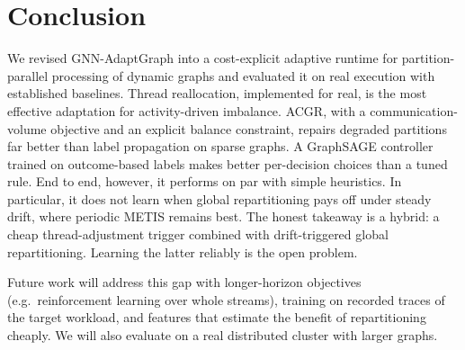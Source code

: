 \section{Conclusion}
We revised GNN-AdaptGraph into a cost-explicit adaptive runtime for partition-parallel
processing of dynamic graphs and evaluated it on real execution with established baselines.
Thread reallocation, implemented for real, is the most effective adaptation for
activity-driven imbalance. ACGR, with a communication-volume objective and an explicit balance
constraint, repairs degraded partitions far better than label propagation on sparse graphs.
A GraphSAGE controller trained on outcome-based labels makes better per-decision choices than
a tuned rule. End to end, however, it performs on par with simple heuristics. In particular,
it does not learn when global repartitioning pays off under steady drift, where periodic
METIS remains best. The honest takeaway is a hybrid: a cheap thread-adjustment trigger
combined with drift-triggered global repartitioning. Learning the latter reliably is
the open problem.

Future work will address this gap with longer-horizon objectives (e.g.\ reinforcement
learning over whole streams), training on recorded traces of the target workload, and features
that estimate the benefit of repartitioning cheaply. We will also evaluate on a real
distributed cluster with larger graphs.
